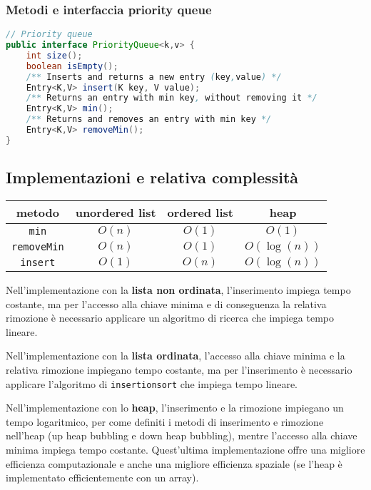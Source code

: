 \documentclass[a4paper]{article}
\begin{document}
\subsubsection*{Metodi e interfaccia priority queue}
\begin{lstlisting}[language=Java]
// Priority queue
public interface PriorityQueue<k,v> {
	int size();
	boolean isEmpty();
	/** Inserts and returns a new entry (key,value) */
	Entry<K,V> insert(K key, V value);
	/** Returns an entry with min key, without removing it */
	Entry<K,V> min();
	/** Returns and removes an entry with min key */
	Entry<K,V> removeMin();
}
\end{lstlisting}

\subsection{Implementazioni e relativa complessità}
\begin{center}
	\begin{tabular}{c | c | c | c}
		\textbf{metodo} & \textbf{unordered list} & \textbf{ordered list} & \textbf{heap} \\
		\toprule
		\verb|min| & \(O(n)\) & \(O(1)\) & \(O(1)\) \\
		\midrule
		\verb|removeMin| & \(O(n)\) & \(O(1)\) & \(O(\log(n))\) \\
		\midrule
		\verb|insert| & \(O(1)\) & \(O(n)\) & \(O(\log(n))\) \\
		\bottomrule
	\end{tabular}
\end{center}

Nell'implementazione con la \textbf{lista non ordinata}, l'inserimento impiega tempo costante, ma per l'accesso alla chiave minima
e di conseguenza la relativa rimozione è necessario applicare un algoritmo di ricerca che impiega tempo lineare.

Nell'implementazione con la \textbf{lista ordinata}, l'accesso alla chiave minima e la relativa rimozione impiegano tempo costante,
ma per l'inserimento è necessario applicare l'algoritmo di \verb|insertionsort| che impiega tempo lineare.

Nell'implementazione con lo \textbf{heap}, l'inserimento e la rimozione impiegano un tempo logaritmico, per come definiti i metodi
di inserimento e rimozione nell'heap (up heap bubbling e down heap bubbling), mentre l'accesso alla chiave minima impiega tempo
costante. Quest'ultima implementazione offre una migliore efficienza computazionale e anche una migliore efficienza spaziale (se
l'heap è implementato efficientemente con un array).
\end{document}
